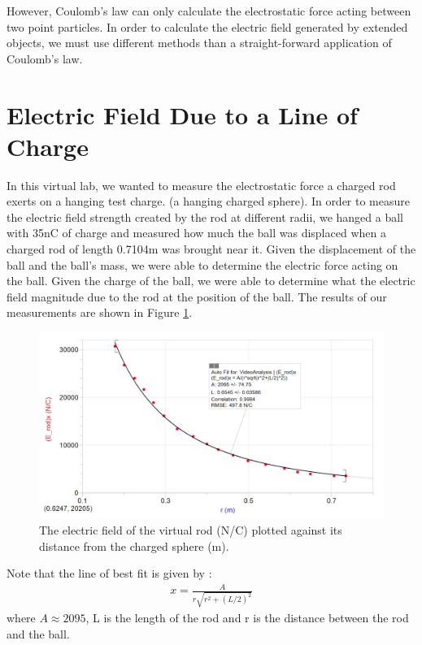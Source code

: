 \documentclass[oneside,12pt]{amsart}
\begin{document}
	\indent However, Coulomb's law can only calculate the electrostatic force acting between two point particles. In order to calculate the electric field generated by extended objects, we must use different methods than a straight-forward application of Coulomb's law.	
	
	\section{Electric Field Due to a Line of Charge}
	\indent In this virtual lab, we wanted to measure the electrostatic force a charged rod exerts on a hanging test charge. (a hanging charged sphere). In order to measure the electric field strength created by the rod at different radii, we hanged a ball with 35nC of charge and measured how much the ball was displaced when a charged rod of length 0.7104m was brought near it. Given the displacement of the ball and the ball's mass, we were able to determine the electric force acting on the ball. Given the charge of the ball, we were able to determine what the electric field magnitude due to the rod at the position of the ball. The results of our measurements are shown in Figure \ref{Fld}.\\
	
	\begin{figure}[h]
		\includegraphics[width=\medgraph,scale=0.01]{FieldStrength.png}
		\caption{The electric field of the virtual rod (N/C) plotted against its distance from the charged sphere (m). 
		}
		\label{Fld}
	\end{figure}
	
	\indent Note that the line of best fit is given by :
	\begin{align*}
	x=\frac{A}{r\sqrt{r^2+(L/2)^2}	}
	\end{align*}
	where $A\approx 2095$, L is the length of the rod and r is the distance between the rod and the ball.
	
\end{document}
